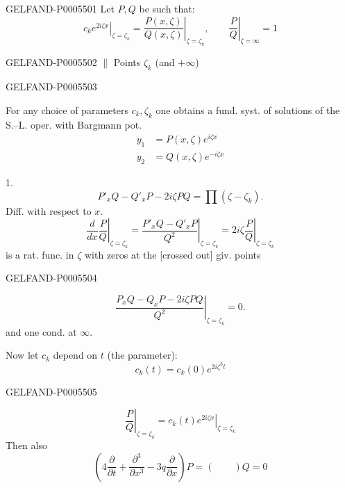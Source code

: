 \begin{GelfandAdjacentEvidence}{GELFAND-P000550}{1}
Let \(P,Q\) be such that:
\[
\left.c_k e^{2i\zeta x}\right|_{\zeta=\zeta_k}
=\left.\frac{P(x,\zeta)}{Q(x,\zeta)}\right|_{\zeta=\zeta_k},
\qquad
\left.\frac{P}{Q}\right|_{\zeta=\infty}=1
\]
\end{GelfandAdjacentEvidence}
\begin{GelfandAdjacentEvidence}{GELFAND-P000550}{2}
\(\parallel\) Points \(\zeta_k\)
\quad{} (and \(+\infty\))
\end{GelfandAdjacentEvidence}
\begin{GelfandAdjacentEvidence}{GELFAND-P000550}{3}


For any choice of parameters \(c_k,\zeta_k\) one obtains a fund. syst. of solutions of the S.–L. oper. with Bargmann pot.
\[
\begin{aligned}
y_1&=P(x,\zeta)e^{i\zeta x}\\
y_2&=Q(x,\zeta)e^{-i\zeta x}
\end{aligned}
\]

1.
\[
P'_x Q-Q'_x P-2i\zeta P Q=\prod(\zeta-\zeta_k).
\]
Diff. with respect to \(x\).
\[
\frac{d}{dx}\left.\frac P Q\right|_{\zeta=\zeta_k}
=\left.\frac{P'_x Q-Q'_x P}{Q^2}\right|_{\zeta=\zeta_k}
=2i\zeta\left.\frac{P}{Q}\right|_{\zeta=\zeta_k}
\]
is a rat. func. in \(\zeta\) with zeros at the [crossed out] giv. points
\end{GelfandAdjacentEvidence}
\begin{GelfandAdjacentEvidence}{GELFAND-P000550}{4}

\[
\left.\frac{P_x Q-Q_x P-2i\zeta P Q}{Q^2}\right|_{\zeta=\zeta_k}=0.
\]
and one cond. at \(\infty\).

Now let \(c_k\) depend on \(t\) (the parameter):
\[
c_k(t)=c_k(0)e^{2i\zeta^3 t}
\]
\end{GelfandAdjacentEvidence}
\begin{GelfandAdjacentEvidence}{GELFAND-P000550}{5}

\[
\left.\frac P Q\right|_{\zeta=\zeta_k}
=\left.c_k(t)e^{2i\zeta x}\right|_{\zeta=\zeta_k}
\]
Then also
\[
\left(4\frac{\partial}{\partial t}+\frac{\partial^3}{\partial x^3}
-3q\frac{\partial}{\partial x}\right)P=(\qquad)Q=0
\]
\end{GelfandAdjacentEvidence}
